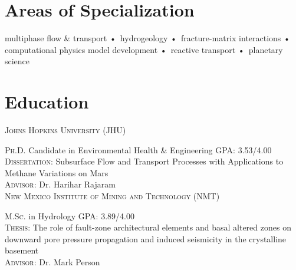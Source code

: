 \documentclass[11pt, letterpaper]{article}
\newcommand{\years}[1]{\marginnote{\scriptsize #1}}
\begin{document}

\section*{Areas of Specialization}
\begin{center}
    multiphase flow \& transport •\ hydrogeology •\ fracture-matrix interactions •\ \\
    computational physics model development •\ reactive transport •\ planetary science %
\end{center}

\section*{Education}
\noindent
\newlength\q
\setlength{}

\years{Current}\textsc{Johns Hopkins University (JHU)}

    \noindent
    \textsc{Ph.D.} Candidate in Environmental Health \& Engineering \hfill GPA: 3.53/4.00\\
    \textsc{Dissertation:} Subsurface Flow and Transport Processes with
    Applications to Methane Variations on Mars\\
    \textsc{Advisor:} Dr. Harihar Rajaram \\

\years{2017}\textsc{New Mexico Institute of Mining and Technology (NMT)}

    \textsc{M.Sc.} in Hydrology \hfill GPA: 3.89/4.00\\
	\textsc{Thesis:} The role of fault-zone architectural elements and basal
	altered zones on downward pore pressure propagation and induced seismicity
	in the crystalline basement\\
    \textsc{Advisor:} Dr. Mark Person\\
\end{document}
